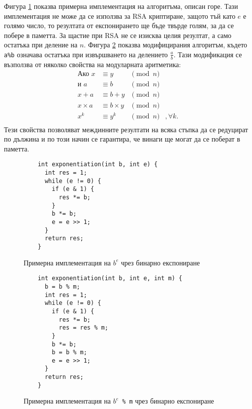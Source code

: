   Фигура \ref{fig:binexp} показва примерна имплементация на алгоритъма, описан горе. Тази имплементация не може да се използва за RSA криптиране, защото тъй като $e$ е голямо число, то резултата от експонирането ще бъде твърде голям, за да се побере в паметта. За щастие при RSA не се изисква целия резултат, а само остатъка при деление на $n$. Фигура \ref{fig:binmodexp} показва модифицирания алгоритъм, където {\tt a\%b} означава остатъка при извършването на делението $\frac{a}{b}$. Тази модификация се възползва от няколко свойства на модуларната аритметика:
  \begin{equation}
    \begin{alignedat}{3}
      \textrm{Ако } x &\equiv y &\pmod{n}  \\
      \textrm{и } a &\equiv b &\pmod{n} \\
      \hline
      x + a &\equiv b + y &\pmod{n} \\
      x \times a &\equiv b \times y &\pmod{n} \\
      x^k &\equiv y^k &\pmod{n}&, \forall k. \\
    \end{alignedat}
    \label{modular-arithmetic-properties}
  \end{equation}
  Тези свойства позволяват междинните резултати на всяка стъпка да се редуцират по дължина и по този начин се гарантира, че винаги ще могат да се поберат в паметта.

  \begin{figure}[ht]
    \caption{Примерна имплементация на $b^e$ чрез бинарно експониране}
    \label{fig:binexp}
    \begin{verbatim}
    int exponentiation(int b, int e) {
      int res = 1;
      while (e != 0) {
        if (e & 1) {
          res *= b;
        }
        b *= b;
        e = e >> 1;
      }
      return res;
    }
    \end{verbatim}
  \end{figure}

  \begin{figure}[ht]
    \caption{Примерна имплементация на {\tt $b^e$ \% m} чрез бинарно експониране}
    \label{fig:binmodexp}
    \begin{verbatim}
    int exponentiation(int b, int e, int m) {
      b = b % m;
      int res = 1;
      while (e != 0) {
        if (e & 1) {
          res *= b;
          res = res % m;
        }
        b *= b;
        b = b % m;
        e = e >> 1;
      }
      return res;
    }
    \end{verbatim}
  \end{figure}

